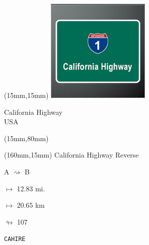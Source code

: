 \begin{textblock*}{50mm}(15mm,15mm)%
\includegraphics[width=50mm]{LG/2015-05-20_00077.png}
\par California Highway\\ USA
\end{textblock*}
\begin{textblock*}{185mm}(15mm,80mm)%
\end{textblock*}
\begin{textblock*}{40mm}(160mm,15mm)%
California Highway Reverse
\par A $\rightsquigarrow$ B
\Large
\par$\mapsto$ 12.83 mi.
\par$\mapsto$ 20.65 km
\par$\looparrowright$ 107
\par\hfill\tiny\tt CAHIRE\\
\end{textblock*}
\null\newpage

